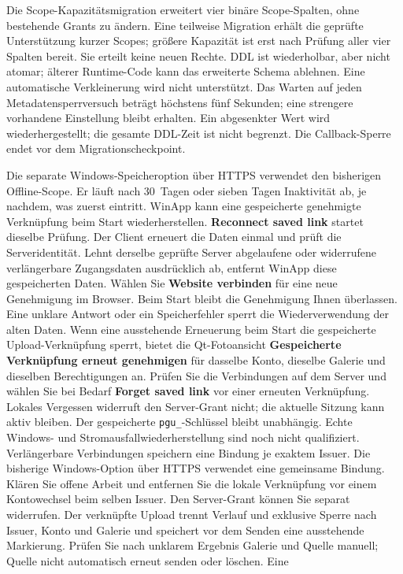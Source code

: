 \documentclass[11pt,a4paper]{article}
\newcommand{\ui}[1]{\textbf{#1}}
\begin{document}
Die Scope-Kapazitätsmigration erweitert vier binäre Scope-Spalten, ohne
bestehende Grants zu ändern. Eine teilweise Migration erhält die geprüfte
Unterstützung kurzer Scopes; größere Kapazität ist erst nach Prüfung aller vier
Spalten bereit. Sie erteilt keine neuen Rechte. DDL ist wiederholbar, aber
nicht atomar; älterer Runtime-Code kann das erweiterte Schema ablehnen.
Eine automatische Verkleinerung wird nicht unterstützt.
Das Warten auf jeden Metadatensperrversuch beträgt höchstens fünf Sekunden;
eine strengere vorhandene Einstellung bleibt erhalten. Ein abgesenkter Wert
wird wiederhergestellt; die gesamte DDL-Zeit ist nicht begrenzt. Die
Callback-Sperre endet vor dem Migrationscheckpoint.

Die separate Windows-Speicheroption über HTTPS verwendet den bisherigen
Offline-Scope. Er läuft nach 30~Tagen oder sieben Tagen Inaktivität ab,
je nachdem, was zuerst eintritt. WinApp kann eine gespeicherte genehmigte
Verknüpfung beim Start wiederherstellen.
\ui{Reconnect saved link} startet dieselbe Prüfung. Der Client erneuert
die Daten einmal und prüft die Serveridentität. Lehnt derselbe geprüfte
Server abgelaufene oder widerrufene verlängerbare Zugangsdaten ausdrücklich ab,
entfernt WinApp diese gespeicherten Daten. Wählen Sie \ui{Website verbinden} für
eine neue Genehmigung im Browser. Beim Start bleibt die Genehmigung Ihnen
überlassen. Eine unklare Antwort oder ein
Speicherfehler sperrt die Wiederverwendung der alten Daten. Wenn eine
ausstehende Erneuerung beim Start die gespeicherte Upload-Verknüpfung sperrt,
bietet die Qt-Fotoansicht
\ui{Gespeicherte Verknüpfung erneut genehmigen} für dasselbe Konto, dieselbe
Galerie und dieselben Berechtigungen an. Prüfen Sie die
Verbindungen auf dem Server und wählen Sie bei Bedarf \ui{Forget saved link}
vor einer erneuten Verknüpfung. Lokales Vergessen widerruft den Server-Grant
nicht; die aktuelle Sitzung kann aktiv bleiben. Der gespeicherte
\texttt{pgu\_}-Schlüssel bleibt unabhängig. Echte Windows- und
Stromausfallwiederherstellung sind noch nicht qualifiziert. Verlängerbare
Verbindungen speichern eine Bindung je exaktem Issuer.
Die bisherige Windows-Option über HTTPS verwendet eine gemeinsame Bindung.
Klären Sie offene Arbeit und entfernen Sie die lokale Verknüpfung vor
einem Kontowechsel beim selben Issuer. Den Server-Grant können Sie separat
widerrufen. Der verknüpfte Upload trennt Verlauf und
exklusive Sperre nach Issuer, Konto und Galerie und speichert vor dem Senden
eine ausstehende Markierung. Prüfen Sie nach unklarem Ergebnis Galerie und
Quelle manuell; Quelle nicht automatisch erneut senden oder löschen. Eine
\end{document}
